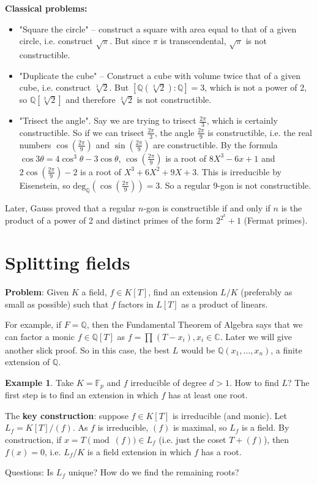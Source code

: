 \documentclass{article}
\theoremstyle{definition}
\newtheorem{example}{Example}[section]
\begin{document}
\textbf{Classical problems:}
\begin{itemize}
    \item "Square the circle" -- construct a square with area equal to that of a given circle, i.e. construct $\sqrt{\pi}$. But since $\pi$ is transcendental, $\sqrt{\pi}$ is not constructible.
    \item "Duplicate the cube" -- Construct a cube with volume twice that of a given cube, i.e. construct $\sqrt[3]{2}$. But $[\mathbb{Q}(\sqrt[3]{2}) : \mathbb{Q}] = 3$, which is not a power of 2, so $\mathbb{Q}[\sqrt[3]{2}]$ and therefore $\sqrt[3]{2}$ is not constructible.
    \item "Trisect the angle". Say we are trying to trisect $\frac{2\pi}{3}$, which is certainly constructible. So if we can trisect $\frac{2\pi}{3}$, the angle $\frac{2\pi}{9}$ is constructible, i.e. the real numbers $\cos\left(\frac{2\pi}{9}\right)$ and $\sin\left(\frac{2\pi}{9}\right)$ are constructible. By the formula $\cos 3\theta = 4\cos^3\theta- 3\cos \theta$, $\cos\left(\frac{2\pi}{9}\right)$ is a root of $8X^3 - 6x + 1$ and $2\cos\left(\frac{2\pi}{9}\right) - 2$ is a root of $X^3 + 6X^2 + 9X + 3$. This is irreducible by Eisenstein, so $\text{deg}_{\mathbb{Q}}(\cos\left(\frac{2\pi}{9}\right)) = 3$. So a regular 9-gon is not constructible.
\end{itemize}

Later, Gauss proved that a regular $n$-gon is constructible if and only if $n$ is the product of a power of 2 and distinct primes of the form $2^{2^k}+1$ (Fermat primes).

\section{Splitting fields}

\textbf{Problem}: Given $K$ a field, $f \in K[T]$, find an extension $L/K$ (preferably as small as possible) such that $f$ factors in $L[T]$ as a product of linears.
\vspace{1mm}

For example, if $F=\mathbb{Q}$, then the Fundamental Theorem of Algebra says that we can factor a monic $f \in \mathbb{Q}[T]$ as $f = \prod_{}^{} (T-x_i), x_i \in \mathbb{C}$. Later we will give another slick proof. So in this case, the best $L$ would be $\mathbb{Q}(x_1,\ldots,x_n)$, a finite extension of $\mathbb{Q}$.

\begin{example}
    Take $K=\mathbb{F}_p$ and $f$ irreducible of degree $d > 1$. How to find $L$? The first step is to find an extension in which $f$ has at least one root.

    The \textbf{key construction}: suppose $f \in K[T]$ is irreducible (and monic). Let $L_f = K[T]/(f)$. As $f$ is irreducible, $(f)$ is maximal, so $L_f$ is a field. By construction, if $x = T \pmod{(f)} \in L_f$ (i.e. just the coset $T+(f)$), then $f(x) = 0$, i.e. $L_f/K$ is a field extension in which $f$ has a root.
\end{example}
Questions: Is $L_f$ unique? How do we find the remaining roots?
\end{document}
